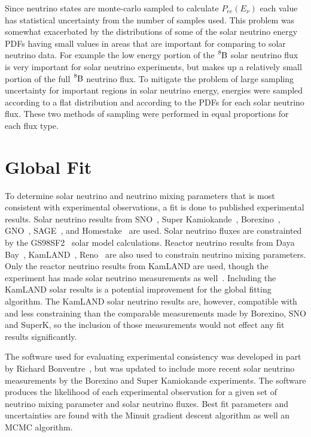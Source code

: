 Since neutrino states are monte-carlo sampled to calculate $P_{ee}(E_{\nu})$
each value has statistical uncertainty from the number of samples used.
This problem was somewhat exacerbated by the distributions of some of the
solar neutrino energy PDFs having small values in areas that are important for
comparing to solar neutrino data. For example the low energy portion of the
$\ce{^{8}B}$ solar neutrino flux is very important for solar neutrino experiments,
but makes up a relatively small portion of the full $\ce{^{8}B}$ neutrino flux.
To mitigate the problem of large sampling uncertainty for important regions in
solar neutrino energy, energies were sampled according to a flat distribution
and according to the PDFs for each solar neutrino flux. These two methods of sampling
were performed in equal proportions for each flux type.

\section{Global Fit}
To determine solar neutrino and neutrino mixing parameters that is most
consistent with experimental observations, a fit is done to published
experimental results.
Solar neutrino results from SNO~\cite{LETA?}, Super Kamiokande~\cite{Superk1234},
Borexino~\cite{Bx1,Bx2}, GNO~\cite{XXX}, SAGE~\cite{XXX}, and
Homestake~\cite{XXX} are used.
Solar neutrino fluxes are constrainted by the GS98SF2~\cite{} solar model calculations.
Reactor neutrino results from Daya Bay~\cite{}, KamLAND~\cite{}, Reno~\cite{}
are also used to constrain neutrino mixing parameters.
Only the reactor neutrino results from KamLAND are used, though
the experiment has made solar neutrino measurements as well~\cite{kamland_be7, kamland_b8}.
Including the KamLAND solar results is a potential improvement for the global fitting
algorithm. The KamLAND solar neutrino results are, however, compatible
with and less constraining than the comparable measurements made by Borexino, SNO and SuperK,
so the inclusion of those measurements would not effect any fit results significantly.

The software used for evaluating experimental consistency was developed
in part by Richard Bonventre~\cite{RICHIE_THESIS, RICHIE_NONSTANDARD},
but was updated to include more recent solar neutrino measurements
by the Borexino and Super Kamiokande experiments.
The software produces the likelihood of each experimental observation
for a given set of neutrino mixing parameter and solar neutrino fluxes.
Best fit parameters and uncertainties are found with the Minuit gradient
descent algorithm as well an MCMC algorithm. %

